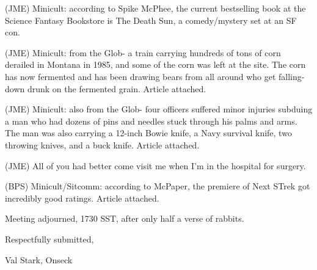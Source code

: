 \documentclass[12pt]{article}
\begin{document}
(JME) Minicult: according to Spike McPhee, the current bestselling book at the Science Fantasy Bookstore is The Death Sun, a comedy/mystery set at an SF con.

(JME) Minicult: from the Glob- a train carrying hundreds of tons of corn derailed in Montana in 1985, and some of the corn was left at the site. The corn has now fermented and has been drawing bears from all around who get falling-down drunk on the fermented grain. Article attached.

(JME) Minicult: also from the Glob- four officers suffered minor injuries subduing a man who had dozens of pins and needles stuck through his palms and arms. The man was also carrying a 12-inch Bowie knife, a Navy survival knife, two throwing knives, and a buck knife. Article attached.

(JME) All of you had better come visit me when I'm in the hospital for surgery.

(BPS) Minicult/Sitcomm: according to McPaper, the premiere of Next STrek got incredibly good ratings. Article attached.

\vspace{12pt}

\noindent
Meeting adjourned, 1730 SST, after only half a verse of rabbits.

\vspace{18pt}

\centerline{Respectfully submitted,}
\centerline{Val Stark, Onseck}
\end{document}
